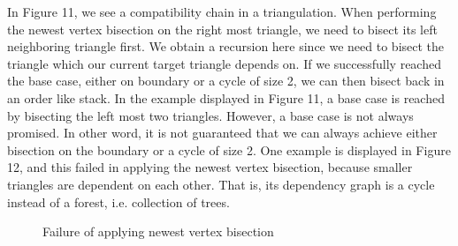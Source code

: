     In Figure 11, we see a compatibility chain in a triangulation. When performing the newest vertex bisection on the right most triangle, we need to bisect its left neighboring triangle first. We obtain a recursion here since we need to bisect the triangle which our current target triangle depends on. If we successfully reached the base case, either on boundary or a cycle of size 2, we can then bisect back in an order like stack. In the example displayed in Figure 11, a base case is reached by bisecting the left most two triangles. However, a base case is not always promised. In other word, it is not guaranteed that we can always achieve either bisection on the boundary or a cycle of size 2. One example is displayed in Figure 12, and this failed in applying the newest vertex bisection, because smaller triangles are dependent on each other. That is, its dependency graph is a cycle instead of a forest, i.e. collection of trees.

    \begin{figure}[h!]
    \centering
    \usetikzlibrary{calc}
    \caption{Failure of applying newest vertex bisection}
    \end{figure}



